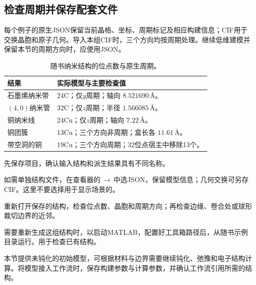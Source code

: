 \subsection{检查周期并保存配套文件}

每个例子的原生JSON保留当前晶格、坐标、周期标记及相应构建信息；CIF用于交换晶胞和原子几何。导入本组CIF时，三个方向均按周期处理。继续低维建模并保留本节的周期方向时，应使用JSON。

\begin{table}[htbp]
\centering\small
\caption{随书纳米结构的位点数与原生周期。}
\begin{tabularx}{\linewidth}{lX}
\toprule
结果 & 实际模型与主要检查值\\
\midrule
石墨烯纳米带 & 24C；仅$y$周期；轴向 $8.521690\,\text{\AA}$。\\
$(4,0)$纳米管 & 32C；仅$z$周期；半径 $1.566085\,\text{\AA}$。\\
铜纳米线 & 24Cu；仅$z$周期；轴向 $7.22\,\text{\AA}$。\\
铜团簇 & 13Cu；三个方向非周期；盒长各 $11.61\,\text{\AA}$。\\
带空洞的铜 & 19Cu；三个方向周期；32位点宿主中移除13个。\\
\bottomrule
\end{tabularx}
\end{table}

\begin{steps}
  \item 先保存项目，确认输入结构和派生结果具有不同名称。
  \item 如需单独结构文件，在查看器的\,$\rightarrow$\,中选JSON，保留模型信息；几何交换可另存CIF。这里不要选择用于显示场景的。
  \item 重新打开保存的结构，检查位点数、晶胞和周期方向；再检查边缘、卷合处或球形裁切边界的近邻。
  \item 需要重新生成这组结构时，以启动MATLAB\regmark{}，配置好工具箱路径后，从随书示例目录运行。用于检查已有结构。
\end{steps}

本节提供未钝化的初始模型，可根据材料与边界需要继续钝化、弛豫和电子结构计算。将模型接入工作流时，保存构建参数与计算参数，并确认工作流引用所需的结构。
